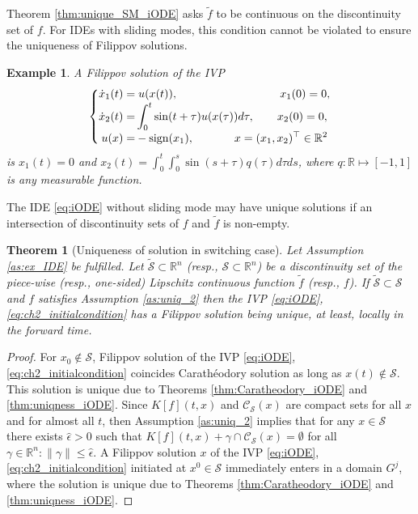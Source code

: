 \documentclass{article}
\newcommand{\R}{\mathbb{R}}
\newcommand{\sign}{\mathrm{sign}}
\newtheorem{theorem}{Theorem}
\newtheorem{example}{Example}
\begin{document}
 	
Theorem \ref{thm:unique_SM_iODE} asks $\tilde f$ to be continuous on the discontinuity set of $f$. For IDEs with  sliding  modes, this condition cannot be violated to ensure the uniqueness of Filippov solutions.
\begin{example}\itshape\label{ex:5}
	A Filippov solution of the IVP\vspace{-1mm}
	\begin{equation}\label{eq:ex_5}\vspace{-1mm}
	\left\{
	\begin{split}
		\dot x_1(t)=&\;u(x(t)),  	\quad\quad\quad \quad\quad \quad \quad \quad \quad x_1(0)=0,\\[-1mm]
		\dot x_2(t)=&\int^t_{0} \sin(t+\tau)u(x(\tau)) d\tau, \quad\quad  x_2(0)=0,\\[-1mm]
		u(x)=&-\sign(x_1), \quad \quad \quad \;\;x=(x_1,x_2)^{\top}\in \R^2
	\end{split}
	\right.
	\end{equation}
 is  $x_1(t)=0$ and $x_2(t)=\int^t_0\int^s_0
  \sin(s+\tau)q(\tau) d\tau ds$, where $q:\R\mapsto [-1,1]$ is any measurable function. 
\end{example}
The IDE \eqref{eq:iODE} without sliding mode may have unique solutions if an  intersection of  discontinuity sets of $f$ and $\tilde f$ is non-empty.
\begin{theorem}[\small Uniqueness of solution in switching case]\label{thm:unique_no_SM_iODE}\hfill \newline\itshape
		Let Assumption \ref{as:ex_IDE} be fulfilled. Let    $\tilde {\mathcal{S}}\subset \R^n$ (resp., $\mathcal{S}\subset \R^n$) be a discontinuity set of the piece-wise  (resp., one-sided) Lipschitz continuous  function $\tilde f$ (resp., $f$). If 
	 $\tilde {\mathcal{S}}\subset \mathcal{S}$ and
	 $f$  satisfies Assumption \ref{as:uniq_2} then
	the IVP  \eqref{eq:iODE}, \eqref{eq:ch2_initialcondition} has a Filippov solution being unique,  at least, locally in the forward time. 	
\end{theorem}	
\begin{proof}
	For $x_0\notin \mathcal{S}$,  Filippov solution of  the IVP \eqref{eq:iODE}, \eqref{eq:ch2_initialcondition} coincides Carath\'eodory solution as long as $x(t)\notin \mathcal{S}$. This solution is unique due to Theorems \ref{thm:Caratheodory_iODE} and  \ref{thm:uniqness_iODE}.
	Since $K[f](t,x)$ and $\mathcal{C}_{\mathcal{S}}(x)$ are compact sets  for all $x$ and for almost all $t$, then Assumption \ref{as:uniq_2} implies that for any $x\in \mathcal{S}$ there exists $\hat \epsilon>0$ such that $K[f](t,x)+\gamma\cap \mathcal{C}_{\mathcal{S}}(x)=\emptyset$ for all $\gamma\in \R^n: \|\gamma\|\leq \hat \epsilon$. A Filippov solution $x$ of the IVP \eqref{eq:iODE}, \eqref{eq:ch2_initialcondition} initiated 
	at $x^0\in \mathcal{S}$ immediately enters in 
	a domain $G^{j}$, where the solution is unique   due to Theorems \ref{thm:Caratheodory_iODE} and \ref{thm:uniqness_iODE}.
\end{proof}	
\end{document}
